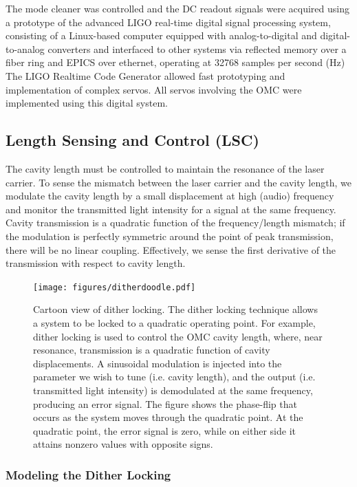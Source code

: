 The mode cleaner was controlled and the DC readout signals were
acquired using a prototype of the advanced LIGO real-time digital
signal processing system, consisting of a Linux-based computer
equipped with analog-to-digital and digital-to-analog converters and
interfaced to other systems via reflected memory over a fiber ring and
EPICS over ethernet, operating at 32768 samples per second (Hz) The
LIGO Realtime Code Generator\cite{Bork2009ELIGO,Bork2009AdvLigo}
allowed fast prototyping and implementation of complex servos.  All
servos involving the OMC were implemented using this digital system.

\subsection{Length Sensing and Control (LSC)}

The cavity length must be controlled to maintain the resonance of the
laser carrier.  To sense the mismatch between the laser carrier and
the cavity length, we modulate the cavity length by a small
displacement at high (audio) frequency and monitor the transmitted light
intensity for a signal at the same frequency.  Cavity transmission is
a quadratic function of the frequency/length mismatch; if the
modulation is perfectly symmetric around the point of peak
transmission, there will be no linear coupling.  Effectively, we sense
the first derivative of the transmission with respect to cavity
length.  

\begin{figure}[t]
\centerline{\texttt{[image: figures/ditherdoodle.pdf]}}
\caption[Cartoon view of dither locking]{\label{fig:dither-doodle}Cartoon view of dither locking.  The dither locking technique allows a system to be locked to a quadratic operating point.  For example, dither locking is used to control the OMC cavity length, where, near resonance, transmission is a quadratic function of cavity displacements.  A sinusoidal modulation is injected into the parameter we wish to tune (i.e. cavity length), and the output (i.e. transmitted light intensity) is demodulated at the same frequency, producing an error signal.  The figure shows the phase-flip that occurs as the system moves through the quadratic point.  At the quadratic point, the error signal is zero, while on either side it attains nonzero values with opposite signs.}
\end{figure}

\subsubsection{Modeling the Dither Locking}


